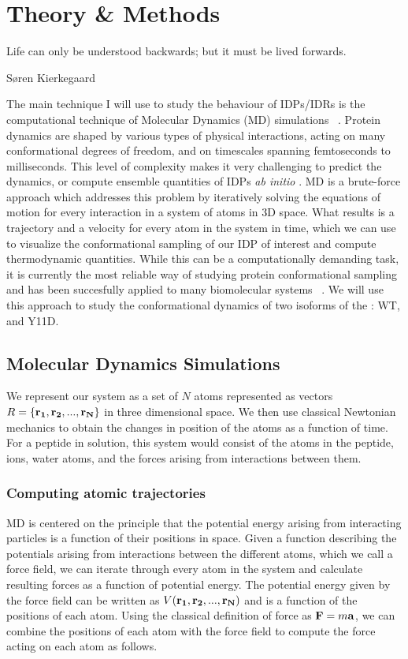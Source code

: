 \chapter{Theory \& Methods}
\epigraph{Life can only be understood backwards; but it must be lived forwards.}{S{\o}ren Kierkegaard}

The main technique I will use to study the behaviour of IDPs/IDRs is the computational technique of Molecular Dynamics (MD) simulations ~\cite{haile1992molecular}. Protein dynamics are shaped by various types of physical interactions, acting on many conformational degrees of freedom, and on timescales spanning femtoseconds to milliseconds. This level of complexity makes it very challenging to predict the dynamics, or compute ensemble quantities of IDPs {\it ab initio} . MD is a brute-force approach which addresses this problem by iteratively solving the equations of motion for every interaction in a system of atoms in 3D space.  What results is a trajectory and a velocity for every atom in the system in time, which we can use to visualize the conformational sampling of our IDP of interest and compute thermodynamic quantities. While this can be a computationally demanding task, it is currently the most reliable way of studying protein conformational sampling \silico and has been succesfully applied to many biomolecular systems ~\cite{karplus2002molecular}. We will use this approach to study the conformational dynamics of two isoforms of the \gct: WT, and Y11D.

\section{Molecular Dynamics Simulations}

We represent our system as a set of $N$ atoms represented as  vectors $R = \{\mathbf{r_1}, \mathbf{r_2}, ... , \mathbf{r_N}\}$ in three dimensional space. We then use classical Newtonian mechanics to obtain the changes in position of the atoms as a function of time. For a peptide in solution, this system would consist of the atoms in the peptide, ions, water atoms, and the forces arising from interactions between them. 

\subsection{Computing atomic trajectories}

MD is centered on the principle that the potential energy arising from interacting particles is a function of their positions in space. Given a function describing the potentials arising from interactions between the different atoms, which we call a force field, we can iterate through every atom in the system and calculate resulting forces as a function of potential energy. The potential energy given by the force field can be written as $V(\mathbf{r_1}, \mathbf{r_2}, ..., \mathbf{r_N})$ and is a function of the positions of each atom. Using the classical definition of force as $\mathbf{F} = m\mathbf{a}$, we can combine the positions of each atom with the force field to compute the force acting on each atom as follows.  

